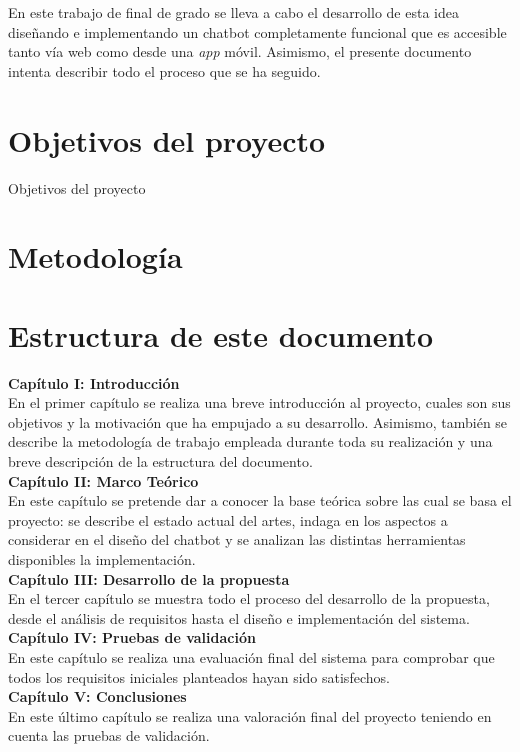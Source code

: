 En este trabajo de final de grado se lleva a cabo el desarrollo de esta idea diseñando e implementando un chatbot completamente funcional que es accesible tanto vía web como desde una \textit{app} móvil. Asimismo, el presente documento intenta describir todo el proceso que se ha seguido.



\section{Objetivos del proyecto}
Objetivos del proyecto

\section{Metodología}


\section{Estructura de este documento}
\noindent \textbf{Capítulo I: Introducción}\\
En el primer capítulo se realiza una breve introducción al proyecto, cuales son sus objetivos y la motivación que ha empujado a su desarrollo. Asimismo, también se describe la metodología de trabajo empleada durante toda su realización y una breve descripción de la estructura del documento.  \\

\noindent \textbf{Capítulo II: Marco Teórico}\\
En este capítulo se pretende dar a conocer la base teórica sobre las cual se basa el proyecto: se describe el estado actual del artes, indaga en los aspectos a considerar en el diseño del chatbot y se analizan las distintas herramientas disponibles la implementación.\\

\noindent \textbf{Capítulo III: Desarrollo de la propuesta}\\
En el tercer capítulo se muestra todo el proceso del desarrollo de la propuesta, desde el análisis de requisitos hasta el diseño e implementación del sistema. \\

\noindent \textbf{Capítulo IV: Pruebas de validación}\\
En este capítulo se realiza una evaluación final del sistema para comprobar que todos los requisitos iniciales planteados hayan sido satisfechos.\\

\noindent \textbf{Capítulo V: Conclusiones}\\
En este último capítulo se realiza una valoración final del proyecto teniendo en cuenta las pruebas de validación.